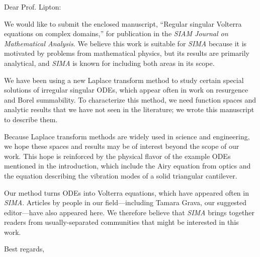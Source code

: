 \documentclass{letter}
\date{January 10, 2025}
\begin{document}
\begin{letter}{}
\opening{Dear Prof. Lipton:}

We would like to submit the enclosed manuscript, ``Regular singular Volterra equations on complex domains,'' for publication in the \textit{SIAM Journal on Mathematical Analysis}. We believe this work is suitable for \textit{SIMA} because it is motivated by problems from mathematical physics, but its results are primarily analytical, and \textit{SIMA} is known for including both areas in its scope.

We have been using a new Laplace transform method to study certain special solutions of irregular singular ODEs, which appear often in work on resurgence and Borel summability. To characterize this method, we need function spaces and analytic results that we have not seen in the literature; we wrote this manuscript to describe them.

Because Laplace transform methods are widely used in science and engineering, we hope these spaces and results may be of interest beyond the scope of our work. This hope is reinforced by the physical flavor of the example ODEs mentioned in the introduction, which include the Airy equation from optics and the equation describing
the vibration modes of a solid triangular cantilever.

Our method turns ODEs into Volterra equations, which have appeared often in \textit{SIMA}. Articles by people in our field---including Tamara Grava, our suggested editor---have also appeared here. We therefore believe that \textit{SIMA} brings together readers from usually-separated communities that might be interested in this work.
\closing{Best regards,}
\end{letter}
\end{document}
